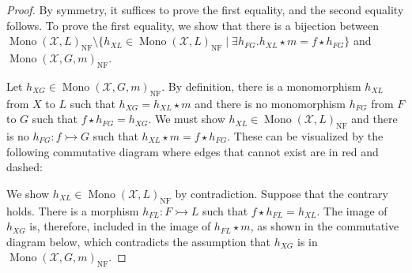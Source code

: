 \begin{proof}
    By symmetry, it suffices to prove the first equality, and the second equality follows. To prove the first equality, we show that there is a bijection between $\operatorname{Mono}(\mathcal{X},L)_{\operatorname{NF}} \mathop{\setminus} \{
                h_{XL} \mathop{\in} \operatorname{Mono}(\mathcal{X},L)_{\operatorname{NF}} \mathop{\mid} 
                \exists h_{FG}. h_{XL} \mathop{\star} m \mathop{=} f \mathop{\star} h_{FG}
            \}$ and $\operatorname{Mono}(\mathcal{X},G,m)_{\operatorname{NF}}$.

    Let $h_{XG} \mathop{\in} \operatorname{Mono}(\mathcal{X},G,m)_{\operatorname{NF}}$. By definition, there is a monomorphism $h_{XL}$ from $X$ to $L$ such that $h_{XG} \mathop{=} h_{XL} \mathop{\star} m$ and there is no monomorphism $h_{FG}$ from $F$ to $G$ such that $f \mathop{\star} h_{FG} \mathop{=} h_{XG}$. We must show $h_{XL} \mathop{\in} \operatorname{Mono}(\mathcal{X},L)_{\operatorname{NF}}$ and there is no $h_{FG}:f \rightarrowtail G$ such that $h_{XL} \mathop{\star} m \mathop{=} f \mathop{\star} h_{FG}$. These can be visualized by the following commutative diagram where edges that cannot exist are in red and dashed:

    \begin{center}
    \end{center}
    
    We show $h_{XL} \mathop{\in} \operatorname{Mono}(\mathcal{X},L)_{\operatorname{NF}}$ by contradiction. Suppose that the contrary holds. There is a morphism $h_{FL}: F \rightarrowtail L$ such that $f \mathop{\star} h_{FL} \mathop{=} h_{XL}$.
    The image of $h_{XG}$ is, therefore, included in the image of $h_{FL} \mathop{\star} m$, as shown in the commutative diagram below, which contradicts the assumption that $h_{XG}$ is in $\operatorname{Mono}(\mathcal{X},G,m)_{\operatorname{NF}}$. 


\end{proof}

